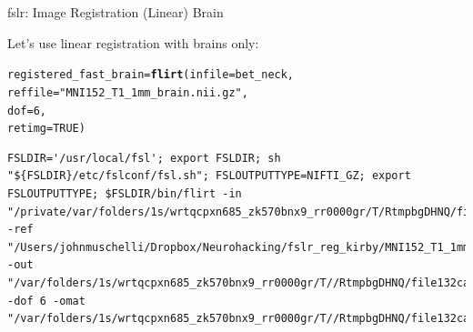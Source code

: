 \documentclass[11pt]{beamer}\usepackage[]{graphicx}\usepackage[]{color}
\makeatletter
\newcommand{\hlnum}[1]{\textcolor[rgb]{0.686,0.059,0.569}{#1}}%
\newcommand{\hlstr}[1]{\textcolor[rgb]{0.192,0.494,0.8}{#1}}%
\newcommand{\hlstd}[1]{\textcolor[rgb]{0.345,0.345,0.345}{#1}}%
\newcommand{\hlkwb}[1]{\textcolor[rgb]{0.69,0.353,0.396}{#1}}%
\newcommand{\hlkwc}[1]{\textcolor[rgb]{0.333,0.667,0.333}{#1}}%
\newcommand{\hlkwd}[1]{\textcolor[rgb]{0.737,0.353,0.396}{\textbf{#1}}}%
\newenvironment{kframe}{%
 \def\at@end@of@kframe{}%
 \ifinner\ifhmode%
  \def\at@end@of@kframe{\end{minipage}}%
  \begin{minipage}{\columnwidth}%
 \fi\fi%
 \def\FrameCommand##1{\hskip\@totalleftmargin \hskip-\fboxsep
 \colorbox{shadecolor}{##1}\hskip-\fboxsep
     \hskip-\linewidth \hskip-\@totalleftmargin \hskip\columnwidth}%
 \MakeFramed {\advance\hsize-\width
   \@totalleftmargin\z@ \linewidth\hsize
   \@setminipage}}%
 {\par\unskip\endMakeFramed%
 \at@end@of@kframe}
\newenvironment{knitrout}{}{} %
\makeatother
\begin{document}
\begin{frame}[fragile]{fslr: Image Registration (Linear) Brain}

Let's use linear registration with brains only:
\begin{knitrout}
\color{fgcolor}\begin{kframe}
\begin{alltt}
\hlstd{registered_fast_brain} \hlkwb{=} \hlkwd{flirt}\hlstd{(}\hlkwc{infile}\hlstd{=bet_neck,}
                              \hlkwc{reffile} \hlstd{=} \hlstr{"MNI152_T1_1mm_brain.nii.gz"}\hlstd{,}
                              \hlkwc{dof} \hlstd{=} \hlnum{6}\hlstd{,}
                              \hlkwc{retimg} \hlstd{=} \hlnum{TRUE}\hlstd{)}
\end{alltt}
\begin{verbatim}
FSLDIR='/usr/local/fsl'; export FSLDIR; sh "${FSLDIR}/etc/fslconf/fsl.sh"; FSLOUTPUTTYPE=NIFTI_GZ; export FSLOUTPUTTYPE; $FSLDIR/bin/flirt -in "/private/var/folders/1s/wrtqcpxn685_zk570bnx9_rr0000gr/T/RtmpbgDHNQ/file132ca74d33680.nii.gz" -ref "/Users/johnmuschelli/Dropbox/Neurohacking/fslr_reg_kirby/MNI152_T1_1mm_brain.nii.gz" -out "/var/folders/1s/wrtqcpxn685_zk570bnx9_rr0000gr/T//RtmpbgDHNQ/file132ca63c086d1" -dof 6 -omat "/var/folders/1s/wrtqcpxn685_zk570bnx9_rr0000gr/T//RtmpbgDHNQ/file132ca569f496b.mat"  
\end{verbatim}
\end{kframe}
\end{knitrout}
\end{frame}
\end{document}
